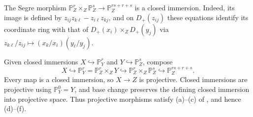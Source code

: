 The Segre morphism $\mathbb P_Z^r\times_Z\mathbb P_Z^s\to\mathbb P_Z^{rs+r+s}$ is a closed immersion. Indeed, its image is defined by $z_{ij}z_{k\ell}-z_{i\ell}z_{kj}$, and on $D_+(z_{ij})$ these equations identify its coordinate ring with that of $D_+(x_i)\times_ZD_+(y_j)$ via $z_{k\ell}/z_{ij}\mapsto(x_k/x_i)(y_\ell/y_j)$.

Given closed immersions $X\hookrightarrow\mathbb P_Y^r$ and $Y\hookrightarrow\mathbb P_Z^s$, compose
\[X\hookrightarrow\mathbb P_Y^r=\mathbb P_Z^r\times_ZY\hookrightarrow\mathbb P_Z^r\times_Z\mathbb P_Z^s\hookrightarrow\mathbb P_Z^{rs+r+s}.\]
Every map is a closed immersion, so $X\to Z$ is projective. Closed immersions are projective using $\mathbb P_Y^0=Y$, and base change preserves the defining closed immersion into projective space. Thus projective morphisms satisfy (a)--(c) of , and hence (d)--(f).
